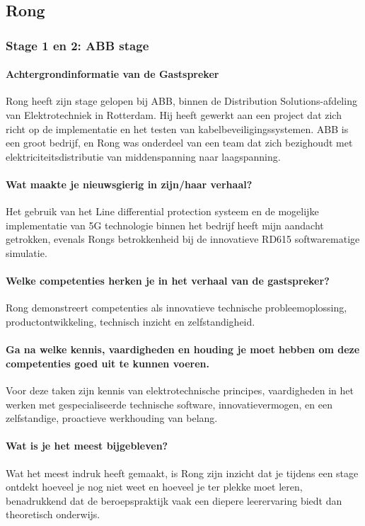 \subsection{Rong}
\subsubsection{Stage 1 en 2: ABB stage}
\paragraph{Achtergrondinformatie van de Gastspreker}
Rong heeft zijn stage gelopen bij ABB, binnen de Distribution Solutions-afdeling van Elektrotechniek in Rotterdam. Hij heeft gewerkt aan een project dat zich richt op de implementatie en het testen van kabelbeveiligingssystemen. ABB is een groot bedrijf, en Rong was onderdeel van een team dat zich bezighoudt met elektriciteitsdistributie van middenspanning naar laagspanning.

\paragraph{Wat maakte je nieuwsgierig in zijn/haar verhaal?}
Het gebruik van het Line differential protection systeem en de mogelijke implementatie van 5G technologie binnen het bedrijf heeft mijn aandacht getrokken, evenals Rongs betrokkenheid bij de innovatieve RD615 softwarematige simulatie.

\paragraph{Welke competenties herken je in het verhaal van de gastspreker?}
Rong demonstreert competenties als innovatieve technische probleemoplossing, productontwikkeling, technisch inzicht en zelfstandigheid.

\paragraph{Ga na welke kennis, vaardigheden en houding je moet hebben om deze competenties goed uit te kunnen voeren.}
Voor deze taken zijn kennis van elektrotechnische principes, vaardigheden in het werken met gespecialiseerde technische software, innovatievermogen, en een zelfstandige, proactieve werkhouding van belang.


\paragraph{Wat is je het meest bijgebleven?}
Wat het meest indruk heeft gemaakt, is Rong zijn inzicht dat je tijdens een stage ontdekt hoeveel je nog niet weet en hoeveel je ter plekke moet leren, benadrukkend dat de beroepspraktijk vaak een diepere leerervaring biedt dan theoretisch onderwijs.
